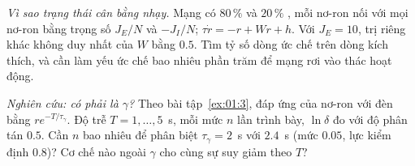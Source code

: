 \begin{exercise}[\lvlB]
\label{ex:01:6}
\emph{Vì sao trạng thái cân bằng nhạy.} Mạng có $80\,\%$  và $20\,\%$ , mỗi nơ-ron nối với mọi nơ-ron bằng trọng số $J_E/N$ và $-J_I/N$; $\tau\dot r=-r+Wr+h$. Với $J_E=10$, trị riêng khác không duy nhất của $W$ bằng $0.5$. Tìm tỷ số dòng ức chế trên dòng kích thích, và cần làm yếu ức chế bao nhiêu phần trăm để mạng rơi vào thác hoạt động.
\end{exercise}

\begin{exercise}[\lvlC]
\label{ex:01:7}
\emph{Nghiên cứu:  có phải là $\gamma$?} Theo bài tập~\ref{ex:01:3}, đáp ứng của nơ-ron  với đèn bằng $re^{-T/\tau_\gamma}$. Độ trễ $T=1,\dots,5$~s, mỗi mức $n$ lần trình bày, $\ln\delta$ đo với độ phân tán $0.5$. Cần $n$ bao nhiêu để phân biệt $\tau_\gamma=2$~s với $2.4$~s (mức $0.05$, lực kiểm định $0.8$)? Cơ chế nào ngoài $\gamma$ cho cùng sự suy giảm theo $T$?
\end{exercise}
